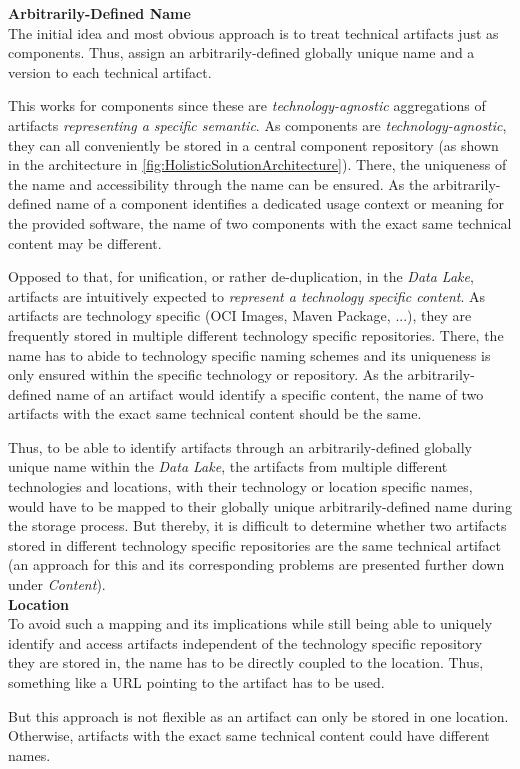 \noindent\textbf{Arbitrarily-Defined Name}\\
The initial idea and most obvious approach is to treat technical artifacts just as components. Thus, assign an arbitrarily-defined globally unique name and a version to each technical artifact.\par 
This works for components since these are \emph{technology-agnostic} aggregations of artifacts \emph{representing a specific semantic}. As components are \emph{technology-agnostic}, they can all conveniently be stored in a central component repository (as shown in the architecture in \ref{fig:HolisticSolutionArchitecture}). There, the uniqueness of the name and accessibility through the name can be ensured. As the arbitrarily-defined name of a component identifies a dedicated usage context or meaning for the provided software, the name of two components with the exact same technical content may be different.\par
Opposed to that, for unification, or rather de-duplication, in the \emph{Data Lake}, artifacts are intuitively expected to \emph{represent a technology specific content}. As artifacts are technology specific (OCI Images, Maven Package, ...), they are frequently stored in multiple different technology specific repositories. There, the name has to abide to technology specific naming schemes and its uniqueness is only ensured within the specific technology or repository. As the arbitrarily-defined name of an artifact would identify a specific content, the name of two artifacts with the exact same technical content should be the same.\par
Thus, to be able to identify artifacts through an arbitrarily-defined globally unique name within the \emph{Data Lake}, the artifacts from multiple different technologies and locations, with their technology or location specific names, would have to be mapped to their globally unique arbitrarily-defined name during the storage process. But thereby, it is difficult to determine whether two artifacts stored in different technology specific repositories are the same technical artifact (an approach for this and its corresponding problems are presented further down under \emph{Content}).\\

\noindent\textbf{Location}\\
To avoid such a mapping and its implications while still being able to uniquely identify and access artifacts independent of the technology specific repository they are stored in, the name has to be directly coupled to the location. Thus, something like a URL pointing to the artifact has to be used.\par
But this approach is not flexible as an artifact can only be stored in one location. Otherwise, artifacts with the exact same technical content could have different names.\\

